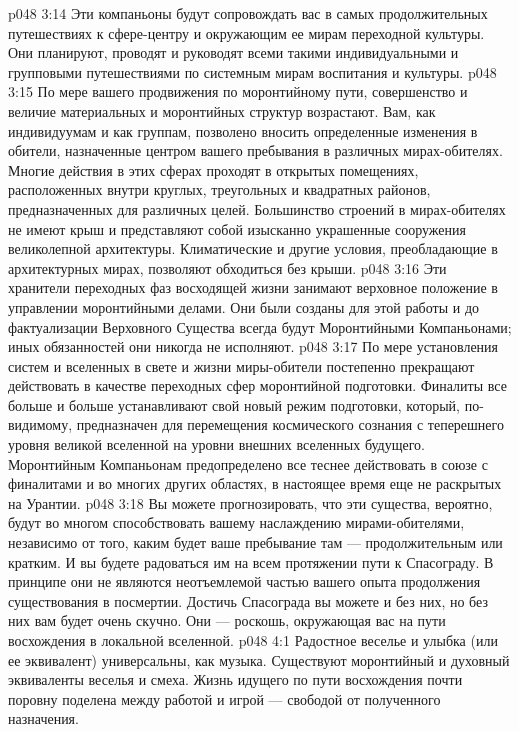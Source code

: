 \vs p048 3:14 \bibnobreakspace {} Эти компаньоны будут сопровождать вас в самых продолжительных путешествиях к сфере\hyp{}центру и окружающим ее мирам переходной культуры. Они планируют, проводят и руководят всеми такими индивидуальными и групповыми путешествиями по системным мирам воспитания и культуры.
\vs p048 3:15 \bibnobreakspace {} По мере вашего продвижения по моронтийному пути, совершенство и величие материальных и моронтийных структур возрастают. Вам, как индивидуумам и как группам, позволено вносить определенные изменения в обители, назначенные центром вашего пребывания в различных мирах\hyp{}обителях. Многие действия в этих сферах проходят в открытых помещениях, расположенных внутри круглых, треугольных и квадратных районов, предназначенных для различных целей. Большинство строений в мирах\hyp{}обителях не имеют крыш и представляют собой изысканно украшенные сооружения великолепной архитектуры. Климатические и другие условия, преобладающие в архитектурных мирах, позволяют обходиться без крыши.
\vs p048 3:16 \pc Эти хранители переходных фаз восходящей жизни занимают верховное положение в управлении моронтийными делами. Они были созданы для этой работы и до фактуализации Верховного Существа всегда будут Моронтийными Компаньонами; иных обязанностей они никогда не исполняют.
\vs p048 3:17 По мере установления систем и вселенных в свете и жизни миры\hyp{}обители постепенно прекращают действовать в качестве переходных сфер моронтийной подготовки. Финалиты все больше и больше устанавливают свой новый режим подготовки, который, по\hyp{}видимому, предназначен для перемещения космического сознания с теперешнего уровня великой вселенной на уровни внешних вселенных будущего. Моронтийным Компаньонам предопределено все теснее действовать в союзе с финалитами и во многих других областях, в настоящее время еще не раскрытых на Урантии.
\vs p048 3:18 Вы можете прогнозировать, что эти существа, вероятно, будут во многом способствовать вашему наслаждению мирами\hyp{}обителями, независимо от того, каким будет ваше пребывание там --- продолжительным или кратким. И вы будете радоваться им на всем протяжении пути к Спасограду. В принципе они не являются неотъемлемой частью вашего опыта продолжения существования в посмертии. Достичь Спасограда вы можете и без них, но без них вам будет очень скучно. Они --- роскошь, окружающая вас на пути восхождения в локальной вселенной.
\vs p048 4:1 Радостное веселье и улыбка (или ее эквивалент) универсальны, как музыка. Существуют моронтийный и духовный эквиваленты веселья и смеха. Жизнь идущего по пути восхождения почти поровну поделена между работой и игрой --- свободой от полученного назначения.
